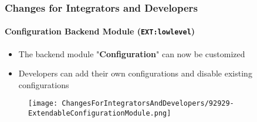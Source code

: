 %

\begin{frame}[fragile]
	\frametitle{Changes for Integrators and Developers}
	\framesubtitle{Configuration Backend Module (\texttt{EXT:lowlevel})}

	\lstset{basicstyle=\tiny\ttfamily}

	\begin{itemize}
		\item The backend module "\textbf{Configuration}" can now be customized
		\item Developers can add their own configurations and disable existing configurations
	\end{itemize}

	\begin{figure}
		\texttt{[image: ChangesForIntegratorsAndDevelopers/92929-ExtendableConfigurationModule.png]}
	\end{figure}

\end{frame}

